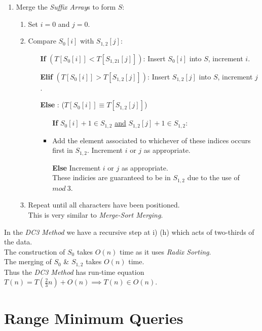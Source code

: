 \documentclass[11pt,a4paper]{article}
\begin{document}
\begin{enumerate}
\begin{enumerate}
	\end{enumerate}
	\item Merge the \textit{Suffix Array}s to form $S$:
	\begin{enumerate}
		\item Set $i=0$ and $j=0$.
		\item Compare $S_0[i]$ with $S_{1,2}[j]$:
		\begin{itemize}
			\item[\textbf{If}] $(T[S_0[i]]<T[S_{1,21}[j]])$: Insert $S_0[i]$ into $S$, increment $i$.
			\item[\textbf{Elif}] $(T[S_0[i]]>T[S_{1,2}[j]])$: Insert $S_{1,2}[j]$ into $S$, increment $j$.
			\item[\textbf{Else}]: (\ie $T[S_0[i]]\equiv T[S_{1,2}[j]]$)
			\begin{itemize}
				\item[\textbf{If}] $S_0[i]+1\in S_{1,2}$ \underline{and} $S_{1,2}[j]+1\in S_{1,2}$:
				\item Add the element associated to whichever of these indices occurs first in $S_{1,2}$. Increment $i$ or $j$ as appropriate.
				\item[\textbf{Else}]  Increment $i$ or $j$ as appropriate.\\
				\nb These indicies are guaranteed to be in $S_{1,2}$ due to the use of $mod\ 3$.
				
			\end{itemize}
		\end{itemize}
		\item Repeat until all characters have been positioned.\\
		\nb This is very similar to \textit{Merge-Sort Merging}.
	\end{enumerate}
\end{enumerate}

In the \textit{DC3 Method} we have a recursive step at i) (h) which acts of two-thirds of the data.\\
The construction of $S_0$ takes $O(n)$ time as it uses \textit{Radix Sorting}.\\
The merging of $S_0$ \& $S_{1,2}$ takes $O(n)$ time.\\
Thus the \textit{DC3 Method} has run-time equation $T(n)=T\left(\frac{2}{3}n\right)+O(n)\implies T(n)\in O(n)$.

\section{Range Minimum Queries}
\end{document}
